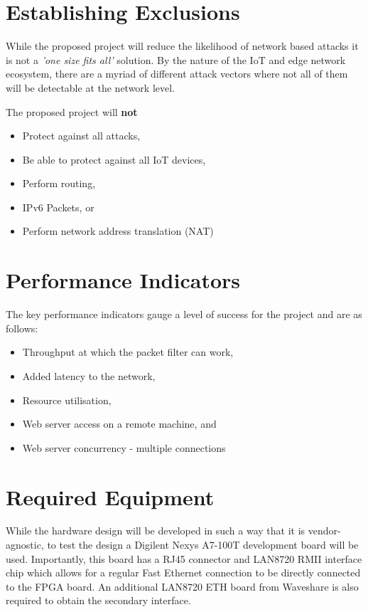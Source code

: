 \section{Establishing Exclusions}

While the proposed project will reduce the likelihood of network based attacks it is not a \textit{'one size fits all'} solution. 
By the nature of the IoT and edge network ecosystem, there are a myriad of different attack vectors where not all of them will be detectable at the
network level.

The proposed project will \textbf{not}
\begin{itemize}
    \item Protect against all attacks,
    \item Be able to protect against all IoT devices,
    \item Perform routing,
    \item IPv6 Packets, or
    \item Perform network address translation (NAT)
\end{itemize}



\section{Performance Indicators}
The key performance indicators gauge a level of success for the project and are as follows: 

\begin{itemize}
    \item Throughput at which the packet filter can work,
    \item Added latency to the network,
    \item Resource utilisation,
    \item Web server access on a remote machine, and
    \item Web server concurrency - multiple connections
\end{itemize}



\section{Required Equipment}
While the hardware design will be developed in such a way that it is vendor-agnostic, to test the design a Digilent Nexys A7-100T development board will be used.
Importantly, this board has a RJ45 connector and LAN8720 RMII interface chip which allows for a regular Fast Ethernet connection to be directly connected 
to the FPGA board. An additional LAN8720 ETH board from Waveshare is also required to obtain the secondary interface. 

